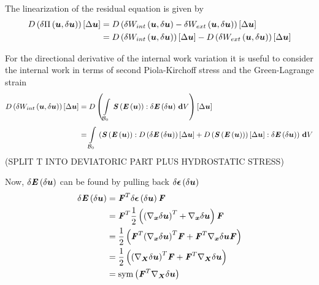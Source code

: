 The linearization of the residual equation is given by 
\begin{equation}
  \begin{split}
       D\left( \delta \Pi\left( \boldsymbol{u},\delta\boldsymbol{u} \right)  \right) \left[ \Delta\boldsymbol{u} \right]  &=
       D\left( \delta W_{int}\left( \boldsymbol{u},\delta\boldsymbol{u} \right) -
      \delta W_{ext}\left( \boldsymbol{u},\delta\boldsymbol{u} \right)  \right) \left[ \Delta\boldsymbol{u} \right]  \\
    &=   D\left( \delta W_{int}\left( \boldsymbol{u},\delta\boldsymbol{u} \right)  \right) \left[ \Delta\boldsymbol{u} \right]  -
       D\left( \delta W_{ext}\left( \boldsymbol{u},\delta\boldsymbol{u} \right)  \right) \left[ \Delta\boldsymbol{u} \right]  
  \end{split}
\end{equation}

For the directional derivative of the internal work variation it is useful to consider
the internal work in terms of second Piola-Kirchoff stress and the
Green-Lagrange strain \ie
\begin{equation}
  \begin{split}
       D\left( \delta W_{int}\left( \boldsymbol{u},\delta\boldsymbol{u} \right)  \right) \left[ \Delta\boldsymbol{u} \right]  &=
       D\left(   \displaystyle\int\limits_{ \mathcal{B} _{0}}^{} \, \boldsymbol{\mathit{S}}\left( 
             \boldsymbol{\mathit{E}}\left( \boldsymbol{u} \right)  \right) :\delta \boldsymbol{\mathit{E}}\left( \delta\boldsymbol{u} \right) \, \boldsymbol{\mathrm{d}}  V  \right) \left[ \Delta\boldsymbol{u} \right]  \\
    &=  \displaystyle\int\limits_{ \mathcal{B} _{0}}^{} \,\left(  \boldsymbol{\mathit{S}}\left( 
           \boldsymbol{\mathit{E}}\left( \boldsymbol{u} \right)  \right) :   D\left( \delta \boldsymbol{\mathit{E}}\left( \delta\boldsymbol{u} \right)  \right) \left[ \Delta\boldsymbol{u} \right]  +
         D\left(  \boldsymbol{\mathit{S}}\left( 
             \boldsymbol{\mathit{E}}\left( \boldsymbol{u} \right)  \right)  \right) \left[ \Delta\boldsymbol{u} \right]  :\delta \boldsymbol{\mathit{E}}\left( \delta\boldsymbol{u} \right)  \right)\, \boldsymbol{\mathrm{d}}  V 
  \end{split}
\end{equation}
(SPLIT T INTO DEVIATORIC PART PLUS HYDROSTATIC STRESS)

Now, $\delta \boldsymbol{\mathit{E}}\left( \delta\boldsymbol{u} \right) $ can be found by pulling
back $\delta \boldsymbol{\mathit{\epsilon}}\left( \delta\boldsymbol{u} \right) $ \ie
\begin{equation}
  \begin{split}
    \delta\fnof{\tensortwo{E}}{\delta\vectr{u}}&=
    \transpose{\tensortwo{F}}\delta\fnof{\tensortwo{\epsilon}}{\delta\vectr{u}}\tensortwo{F}\\
    &=\transpose{\tensortwo{F}}\frac{1}{2}\pbrac{\transpose{\pbrac{\gradient{\vectr{x}}{\delta\vectr{u}}}}
      +\gradient{\vectr{x}}{\delta\vectr{u}}}\tensortwo{F}\\
    &=\frac{1}{2}\pbrac{\transpose{\tensortwo{F}}\transpose{\pbrac{\gradient{\vectr{x}}{\delta\vectr{u}}}}\tensortwo{F}+
      \transpose{\tensortwo{F}}\gradient{\vectr{x}}{\delta\vectr{u}}\tensortwo{F}}\\
    &=\frac{1}{2}\pbrac{\transpose{\pbrac{\gradient{\vectr{X}}{\delta\vectr{u}}}}\tensortwo{F}+
      \transpose{\tensortwo{F}}\gradient{\vectr{X}}{\delta\vectr{u}}} \\
    &= \sympart\pbrac{\transpose{\tensortwo{F}}\gradient{\vectr{X}}{\delta\vectr{u}}}
  \end{split}
\end{equation}

